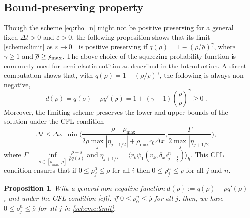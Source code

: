 \documentclass{article}
\newtheorem{proposition}{Proposition}
\newcommand {\e}  {\varepsilon}
\newcommand {\dt}   {\Delta t}
\begin{document}
\subsection{{Bound-preserving property}}
{ Though the scheme \eqref{eq:rho_n} might not be positive preserving for a general fixed $\dt > 0$ and $\e>0$, 
the following proposition shows that its limit \eqref{scheme:limit} as $\e\to 0^+$ is positive preserving if $q(\rho) = 1 - (\rho / \bar{\rho})^\gamma$, where $\gamma\ge1$ and $\overline{\rho}\ge\rho_{\rm{max}}$.
 The above choice of the squeezing probability function is commonly used  for semi-elastic entities as described in the Introduction. 
 A direct computation shows that, with $q(\rho)= 1 - (\rho / \bar{\rho})^\gamma$, the following is always non-negative, 
\begin{equation*}
    d(\rho)= q(\rho) - \rho q'(\rho) = 1 + (\gamma-1)\left(\frac{\rho}{\overline{\rho}}\right)^{\gamma} \ge 0\ .
\end{equation*}
Moreover, the limiting scheme preserves the lower and upper bounds of the solution under the CFL condition 
\begin{equation}\label{cfl}
\Delta t \leq \Delta x \; \min \big(\frac{\bar{\rho} - \rho_{\max}}{2 \bar{\rho} \max_j |\eta_{j+1/2}| + \rho_{\max} r_0 \Delta x}, \frac{\Gamma}{2 \max_j |\eta_{j+1/2}|} \big),
\end{equation}
\noindent where $\Gamma = \underset{s\in [\rho_{\max}, \bar{\rho}]}{\inf} \frac{\bar{\rho} - s}{\bar{\rho} q(s)}$ { and $\eta_{j+1/2}= \langle v_k \psi_1(v_k, \delta_x c_{j+\frac12}^n)\rangle_h$}. This CFL condition ensures that if $0 \leq \rho_j^0 \leq \bar{\rho}$ for all $i$ then $0 \leq \rho_j^n \leq \bar{\rho}$ for all $j$ and $n$.
}
\begin{proposition} 
 {   With a general non-negative function $d(\rho) :=q(\rho) - \rho q'(\rho)$, and under the CFL condition \eqref{cfl}, if $0 \leq \rho_0^n \leq \bar{\rho}$ for all $j$, then, we have 
    $0 \leq \rho_j^n \leq \bar{\rho}$ for all $j$ in \eqref{scheme:limit}.}
\end{proposition}
\end{document}
